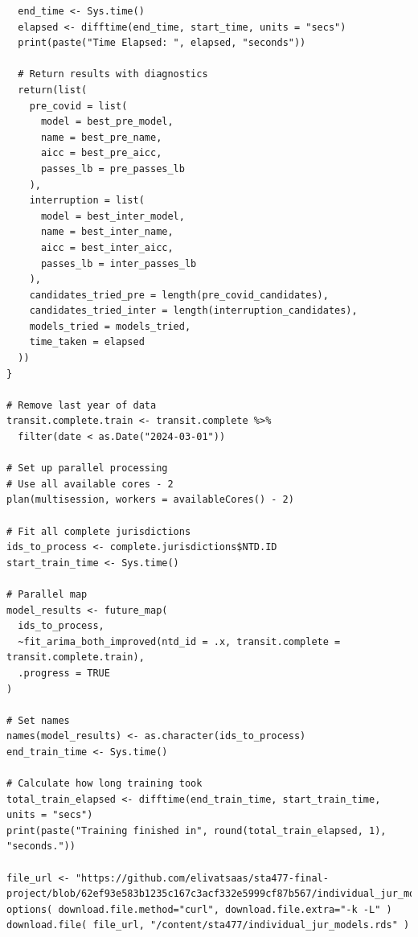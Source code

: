\documentclass[11pt]{article}
\def\spacingset#1{\renewcommand{\baselinestretch}{#1}\small\normalsize}
\begin{document}
{\begin{verbatim}
  end_time <- Sys.time()
  elapsed <- difftime(end_time, start_time, units = "secs")
  print(paste("Time Elapsed: ", elapsed, "seconds"))
  
  # Return results with diagnostics
  return(list(
    pre_covid = list(
      model = best_pre_model, 
      name = best_pre_name, 
      aicc = best_pre_aicc,
      passes_lb = pre_passes_lb
    ),
    interruption = list(
      model = best_inter_model, 
      name = best_inter_name, 
      aicc = best_inter_aicc,
      passes_lb = inter_passes_lb
    ),
    candidates_tried_pre = length(pre_covid_candidates),
    candidates_tried_inter = length(interruption_candidates),
    models_tried = models_tried, 
    time_taken = elapsed
  ))
}

# Remove last year of data
transit.complete.train <- transit.complete %>%
  filter(date < as.Date("2024-03-01"))

# Set up parallel processing
# Use all available cores - 2
plan(multisession, workers = availableCores() - 2)

# Fit all complete jurisdictions
ids_to_process <- complete.jurisdictions$NTD.ID
start_train_time <- Sys.time()

# Parallel map
model_results <- future_map(
  ids_to_process,
  ~fit_arima_both_improved(ntd_id = .x, transit.complete = transit.complete.train),
  .progress = TRUE
)

# Set names
names(model_results) <- as.character(ids_to_process)
end_train_time <- Sys.time()

# Calculate how long training took
total_train_elapsed <- difftime(end_train_time, start_train_time, units = "secs")
print(paste("Training finished in", round(total_train_elapsed, 1), "seconds."))

file_url <- "https://github.com/elivatsaas/sta477-final-project/blob/62ef93e583b1235c167c3acf332e5999cf87b567/individual_jur_models.rds"
options( download.file.method="curl", download.file.extra="-k -L" )
download.file( file_url, "/content/sta477/individual_jur_models.rds" )
\end{verbatim}
}

\spacingset{1.1}




\citet{Hyndman2024}

\citet{FTA2025}

\end{document}
